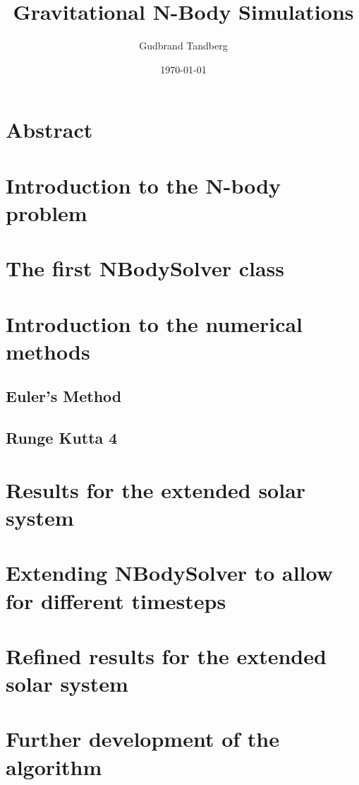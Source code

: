 \documentclass[11pt, oneside]{article}   	%
\title{Gravitational N-Body Simulations}
\author{Gudbrand Tandberg}
\date{\today}							%
\begin{document}
\maketitle
\newpage


\section{Abstract}

\section{Introduction to the N-body problem}

\section{The first NBodySolver class}

\section{Introduction to the numerical methods}
\subsection{Euler's Method}
\subsection{Runge Kutta 4}

\section{Results for the extended solar system}

\section{Extending NBodySolver to allow for different timesteps}

\section{Refined results for the extended solar system}

\section{Further development of the algorithm}
\end{document}
